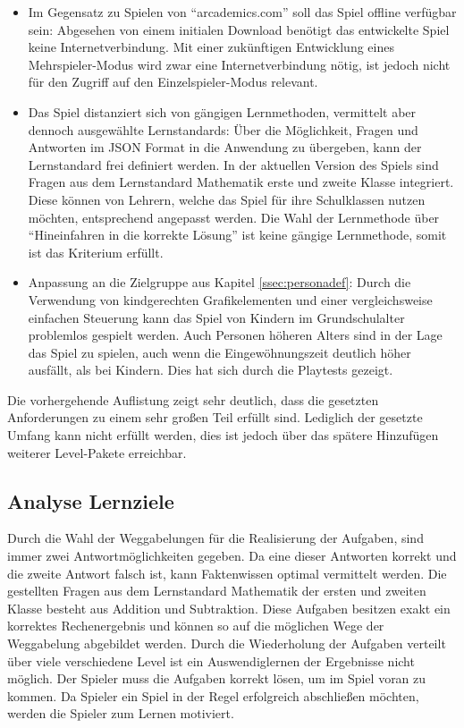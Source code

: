 \begin{itemize}
    \item{Im Gegensatz zu Spielen von \enquote{arcademics.com} soll das Spiel offline verfügbar sein: Abgesehen von einem initialen Download benötigt das entwickelte Spiel keine Internetverbindung. Mit einer zukünftigen Entwicklung eines Mehrspieler-Modus wird zwar eine Internetverbindung nötig, ist jedoch nicht für den Zugriff auf den Einzelspieler-Modus relevant.}
    \item{Das Spiel distanziert sich von gängigen Lernmethoden, vermittelt aber dennoch ausgewählte Lernstandards: Über die Möglichkeit, Fragen und Antworten im JSON Format in die Anwendung zu übergeben, kann der Lernstandard frei definiert werden. In der aktuellen Version des Spiels sind Fragen aus dem Lernstandard Mathematik erste und zweite Klasse integriert. Diese können von Lehrern, welche das Spiel für ihre Schulklassen nutzen möchten, entsprechend angepasst werden. Die Wahl der Lernmethode über \enquote{Hineinfahren in die korrekte Lösung} ist keine gängige Lernmethode, somit ist das Kriterium erfüllt.}
    \item{Anpassung an die Zielgruppe aus Kapitel \ref{ssec:personadef}: Durch die Verwendung von kindgerechten Grafikelementen und einer vergleichsweise einfachen Steuerung kann das Spiel von Kindern im Grundschulalter problemlos gespielt werden. Auch Personen höheren Alters sind in der Lage das Spiel zu spielen, auch wenn die Eingewöhnungszeit deutlich höher ausfällt, als bei Kindern. Dies hat sich durch die Playtests gezeigt.}
\end{itemize}
Die vorhergehende Auflistung zeigt sehr deutlich, dass die gesetzten Anforderungen zu einem sehr großen Teil erfüllt sind. Lediglich der gesetzte Umfang kann nicht erfüllt werden, dies ist jedoch über das spätere Hinzufügen weiterer Level-Pakete erreichbar.

\subsection{Analyse Lernziele}
Durch die Wahl der Weggabelungen für die Realisierung der Aufgaben, sind immer zwei Antwortmöglichkeiten gegeben. Da eine dieser Antworten korrekt und die zweite Antwort falsch ist, kann Faktenwissen optimal vermittelt werden. Die gestellten Fragen aus dem Lernstandard Mathematik der ersten und zweiten Klasse besteht aus Addition und Subtraktion. Diese Aufgaben besitzen exakt ein korrektes Rechenergebnis und können so auf die möglichen Wege der Weggabelung abgebildet werden. Durch die Wiederholung der Aufgaben verteilt über viele verschiedene Level ist ein Auswendiglernen der Ergebnisse nicht möglich. Der Spieler muss die Aufgaben korrekt lösen, um im Spiel voran zu kommen. Da Spieler ein Spiel in der Regel erfolgreich abschließen möchten, werden die Spieler zum Lernen motiviert.

